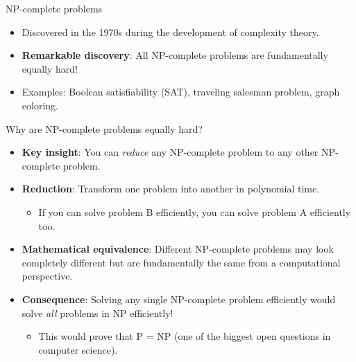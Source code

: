 \documentclass[aspectratio=169, lualatex, handout]{beamer}
\begin{document}
\begin{frame}{NP-complete problems}
	\begin{itemize}[<+->]
		\item Discovered in the 1970s during the development of complexity theory.
		\item \textbf{Remarkable discovery}: All NP-complete problems are fundamentally equally hard!
		\item Examples: Boolean satisfiability (SAT), traveling salesman problem, graph coloring.
	\end{itemize}
\end{frame}

\begin{frame}{Why are NP-complete problems equally hard?}
	\begin{itemize}[<+->]
		\item \textbf{Key insight}: You can \textit{reduce} any NP-complete problem to any other NP-complete problem.
		\item \textbf{Reduction}: Transform one problem into another in polynomial time.
		      \begin{itemize}
			      \item If you can solve problem B efficiently, you can solve problem A efficiently too.
		      \end{itemize}
		\item \textbf{Mathematical equivalence}: Different NP-complete problems may look completely different but are fundamentally the same from a computational perspective.
		\item \textbf{Consequence}: Solving any single NP-complete problem efficiently would solve \textit{all} problems in NP efficiently!
		      \begin{itemize}
			      \item This would prove that P = NP (one of the biggest open questions in computer science).
		      \end{itemize}
	\end{itemize}
\end{frame}
\end{document}
